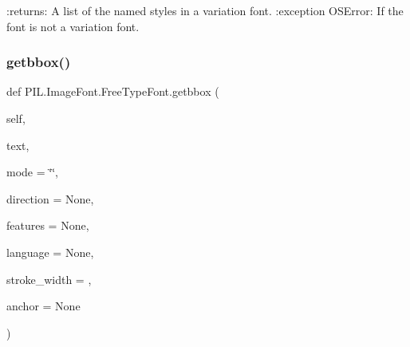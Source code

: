 \begin{DoxyVerb}:returns: A list of the named styles in a variation font.
:exception OSError: If the font is not a variation font.
\end{DoxyVerb}
 \mbox{\label{classPIL_1_1ImageFont_1_1FreeTypeFont_a335212b091da8399d82f685476af9caf}} 
\subsubsection{\texorpdfstring{getbbox()}{getbbox()}}
{\footnotesize\ttfamily def P\+I\+L.\+Image\+Font.\+Free\+Type\+Font.\+getbbox (\begin{DoxyParamCaption}\item[{}]{self,  }\item[{}]{text,  }\item[{}]{mode = {\ttfamily \char`\"{}\char`\"{}},  }\item[{}]{direction = {\ttfamily None},  }\item[{}]{features = {\ttfamily None},  }\item[{}]{language = {\ttfamily None},  }\item[{}]{stroke\+\_\+width = {},  }\item[{}]{anchor = {\ttfamily None} }\end{DoxyParamCaption})}

